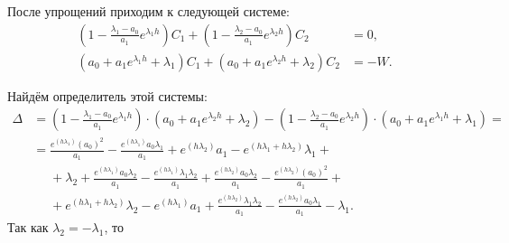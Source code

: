 \documentclass[a4paper,14pt]{article}
\begin{document}
После упрощений приходим к следующей системе:
\begin{equation}
  \begin{aligned}
    \left( 1 - \frac{\lambda_1 - a_0}{a_1} e^{\lambda_1 h} \right) C_1
    +
    \left( 1 - \frac{\lambda_2 - a_0}{a_1} e^{\lambda_2 h} \right) C_2 &= 0, \\
    \left(
    a_0 + a_1 e^{\lambda_1 h} + \lambda_1
    \right) C_1
    +
    \left(
    a_0 + a_1 e^{\lambda_2 h} + \lambda_2
    \right) C_2
    &= -W.
  \end{aligned}
\end{equation}

Найдём определитель этой системы:
\[
  \begin{aligned}
    \Delta
    &=
      \left( 1 - \frac{\lambda_1 - a_0}{a_1} e^{\lambda_1 h} \right)
      \cdot
      \left(
      a_0 + a_1 e^{\lambda_2 h} + \lambda_2
      \right)
      -
      \left( 1 - \frac{\lambda_2 - a_0}{a_1} e^{\lambda_2 h} \right)
      \cdot
      \left(
      a_0 + a_1 e^{\lambda_1 h} + \lambda_1
      \right) = \\
    &=
    \frac{e^{(h \lambda_1)} (a_0)^2}{a_1}
    - \frac{e^{(h \lambda_1)} a_0 \lambda_1}{a_1}
    + e^{(h \lambda_2)} a_1 - e^{(h \lambda_1 + h \lambda_2)} \lambda_1 + \\
    &\phantom{=}
    + \lambda_2 + \frac{e^{(h \lambda_1)} a_0 \lambda_2}{a_1}
    - \frac{e^{(h \lambda_1)} \lambda_1 \lambda_2}{a_1}
    + \frac{e^{(h \lambda_2)} a_0 \lambda_2}{a_1}
    - \frac{e^{(h \lambda_2)} (a_0)^2}{a_1} + \\
    &\phantom{=}
    + e^{(h \lambda_1 + h \lambda_2)} \lambda_2 - e^{(h \lambda_1)} a_1
    + \frac{e^{(h \lambda_2)} \lambda_1 \lambda_2}{a_1}
    - \frac{e^{(h \lambda_2)} a_0 \lambda_1}{a_1} - \lambda_1.
  \end{aligned}
\]
Так как $\lambda_2 = - \lambda_1$, то
\end{document}
